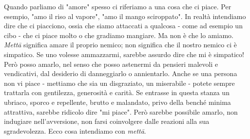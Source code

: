 
Quando parliamo di "amore" spesso ci riferiamo a una cosa che ci piace.
Per esempio, "amo il riso al vapore", "amo il mango sciroppato". In
realtà intendiamo dire che ci piacciono, ossia che siamo attaccati a
qualcosa - come ad esempio un cibo - che ci piace molto o che gradiamo
mangiare. Ma non è che lo amiamo. \textit{Mettā} significa amare il proprio
nemico; non significa che il nostro nemico ci è simpatico. Se uno
volesse ammazzarmi, sarebbe assurdo dire che mi è simpatico! Però posso
amarlo, nel senso che posso astenermi da pensieri malevoli e
vendicativi, dal desiderio di danneggiarlo o annientarlo. Anche se una
persona non vi piace - mettiamo che sia un disgraziato, un miserabile -
potete sempre trattarla con gentilezza, generosità e carità. Se entrasse
in questa stanza un ubriaco, sporco e repellente, brutto e malandato,
privo della benché minima attrattiva, sarebbe ridicolo dire "mi piace".
Però sarebbe possibile amarlo, non indugiare nell'avversione, non farsi
coinvolgere dalle reazioni alla sua sgradevolezza. Ecco cosa intendiamo
con \textit{mettā}.

